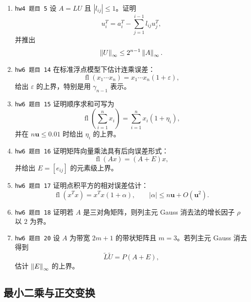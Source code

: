 \documentclass{article}
\newcommand{\fl}{\operatorname{fl}}
\begin{document}
\begin{enumerate}
  \item \texttt{hw4 题目 5} 设 $A=LU$ 且 $|l_{ij}|\le1$。证明
  \[
    u_i^T=a_i^T-\sum_{j=1}^{i-1}l_{ij}u_j^T,
  \]
  并推出
  \[
    \left\| U \right\|_\infty\le 2^{n-1}\left\| A \right\|_\infty.
  \]

  \item \texttt{hw6 题目 14} 在标准浮点模型下估计连乘误差：
  \[
    \fl(x_1\cdots x_n)=x_1\cdots x_n(1+\varepsilon),
  \]
  给出 $\varepsilon$ 的上界，特别是用 $\gamma_{n-1}$ 表示。

  \item \texttt{hw6 题目 15} 证明顺序求和可写为
  \[
    \fl\left(\sum_{i=1}^n x_i\right)=\sum_{i=1}^n x_i(1+\eta_i),
  \]
  并在 $n\mathbf u\le0.01$ 时给出 $\eta_i$ 的上界。

  \item \texttt{hw6 题目 16} 证明矩阵向量乘法具有后向误差形式：
  \[
    \fl(Ax)=(A+E)x,
  \]
  并给出 $E=[e_{ij}]$ 的元素级上界。

  \item \texttt{hw6 题目 17} 证明点积平方的相对误差估计：
  \[
    \fl(x^Tx)=x^Tx(1+\alpha),\qquad
    |\alpha|\le n\mathbf u+O(\mathbf u^2).
  \]

  \item \texttt{hw6 题目 18} 证明若 $A$ 是三对角矩阵，则列主元 Gauss 消去法的增长因子 $\rho$ 以 $2$ 为界。

  \item \texttt{hw6 题目 20} 设 $A$ 为带宽 $2m+1$ 的带状矩阵且 $m=3$。若列主元 Gauss 消去得到
  \[
    \tilde L\tilde U=P(A+E),
  \]
  估计 $\left\| E \right\|_\infty$ 的上界。
\end{enumerate}

\subsection{最小二乘与正交变换}
\end{document}
